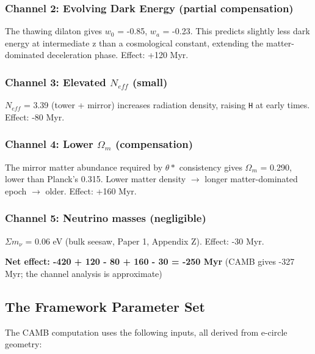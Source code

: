 \documentclass[aps,prd,preprint,superscriptaddress,longbibliography]{revtex4-2}
\begin{document}
\subsubsection{Channel 2: Evolving Dark Energy (partial compensation)}
The thawing dilaton gives $w_{0}$ = -0.85, $w_a$ = -0.23. This predicts slightly less dark energy at intermediate z than a cosmological constant, extending the matter-dominated deceleration phase. Effect: +120 Myr.


\subsubsection{Channel 3: Elevated $N_{eff}$ (small)}
$N_{eff}$ = 3.39 (tower + mirror) increases radiation density, raising \texttt{H} at early times. Effect: -80 Myr.


\subsubsection{Channel 4: Lower $\Omega_m$ (compensation)}
The mirror matter abundance required by $\theta*$ consistency gives $\Omega_m$ = 0.290, lower than Planck's 0.315. Lower matter density $\to$ longer matter-dominated epoch $\to$ older. Effect: +160 Myr.


\subsubsection{Channel 5: Neutrino masses (negligible)}
$\Sigma m_\nu$ = 0.06 eV (bulk seesaw, Paper 1, Appendix Z). Effect: -30 Myr.

\textbf{Net effect: -420 + 120 - 80 + 160 - 30 = -250 Myr} (CAMB gives -327 Myr; the channel analysis is approximate)



\subsection{The Framework Parameter Set}

The CAMB computation uses the following inputs, all derived from e-circle geometry:
\end{document}
